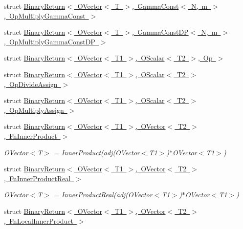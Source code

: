 \begin{DoxyCompactItemize}
\item 
struct \mbox{\hyperlink{structENSEM_1_1BinaryReturn_3_01OVector_3_01T_01_4_00_01GammaConst_3_01N_00_01m_01_4_00_01OpMultiplyGammaConst_01_4}{Binary\+Return$<$ O\+Vector$<$ T $>$, Gamma\+Const$<$ N, m $>$, Op\+Multiply\+Gamma\+Const $>$}}
\item 
struct \mbox{\hyperlink{structENSEM_1_1BinaryReturn_3_01OVector_3_01T_01_4_00_01GammaConstDP_3_01N_00_01m_01_4_00_01OpMultiplyGammaConstDP_01_4}{Binary\+Return$<$ O\+Vector$<$ T $>$, Gamma\+Const\+D\+P$<$ N, m $>$, Op\+Multiply\+Gamma\+Const\+D\+P $>$}}
\item 
struct \mbox{\hyperlink{structENSEM_1_1BinaryReturn_3_01OVector_3_01T1_01_4_00_01OScalar_3_01T2_01_4_00_01Op_01_4}{Binary\+Return$<$ O\+Vector$<$ T1 $>$, O\+Scalar$<$ T2 $>$, Op $>$}}
\item 
struct \mbox{\hyperlink{structENSEM_1_1BinaryReturn_3_01OVector_3_01T1_01_4_00_01OScalar_3_01T2_01_4_00_01OpDivideAssign_01_4}{Binary\+Return$<$ O\+Vector$<$ T1 $>$, O\+Scalar$<$ T2 $>$, Op\+Divide\+Assign $>$}}
\item 
struct \mbox{\hyperlink{structENSEM_1_1BinaryReturn_3_01OVector_3_01T1_01_4_00_01OScalar_3_01T2_01_4_00_01OpMultiplyAssign_01_4}{Binary\+Return$<$ O\+Vector$<$ T1 $>$, O\+Scalar$<$ T2 $>$, Op\+Multiply\+Assign $>$}}
\item 
struct \mbox{\hyperlink{structENSEM_1_1BinaryReturn_3_01OVector_3_01T1_01_4_00_01OVector_3_01T2_01_4_00_01FnInnerProduct_01_4}{Binary\+Return$<$ O\+Vector$<$ T1 $>$, O\+Vector$<$ T2 $>$, Fn\+Inner\+Product $>$}}
\begin{DoxyCompactList}\small\item\em O\+Vector$<$\+T$>$ = Inner\+Product(adj(\+O\+Vector$<$\+T1$>$)$\ast$\+O\+Vector$<$\+T1$>$) \end{DoxyCompactList}\item 
struct \mbox{\hyperlink{structENSEM_1_1BinaryReturn_3_01OVector_3_01T1_01_4_00_01OVector_3_01T2_01_4_00_01FnInnerProductReal_01_4}{Binary\+Return$<$ O\+Vector$<$ T1 $>$, O\+Vector$<$ T2 $>$, Fn\+Inner\+Product\+Real $>$}}
\begin{DoxyCompactList}\small\item\em O\+Vector$<$\+T$>$ = Inner\+Product\+Real(adj(\+O\+Vector$<$\+T1$>$)$\ast$\+O\+Vector$<$\+T1$>$) \end{DoxyCompactList}\item 
struct \mbox{\hyperlink{structENSEM_1_1BinaryReturn_3_01OVector_3_01T1_01_4_00_01OVector_3_01T2_01_4_00_01FnLocalInnerProduct_01_4}{Binary\+Return$<$ O\+Vector$<$ T1 $>$, O\+Vector$<$ T2 $>$, Fn\+Local\+Inner\+Product $>$}}

\end{DoxyCompactItemize}
